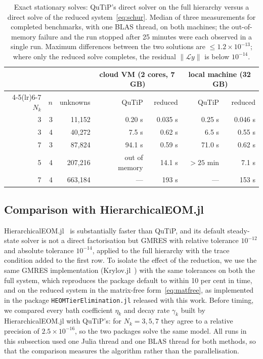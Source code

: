 \documentclass[11pt,a4paper]{article}
\newcommand{\Lc}{\mathcal{L}}
\begin{document}
\begin{table}[h]
\centering\small
\begin{tabular}{rrrrrrr}
\toprule
& & & \multicolumn{2}{c}{cloud VM (2 cores, 7\,GB)} & \multicolumn{2}{c}{local machine (32\,GB)}\\
\cmidrule(lr){4-5}\cmidrule(lr){6-7}
$N_k$ & $n$ & unknowns & QuTiP & reduced & QuTiP & reduced\\
\midrule
3 & 3 & 11{,}152 & 0.20 s & 0.035 s & 0.25 s & 0.046 s\\
3 & 4 & 40{,}272 & 7.5 s & 0.62 s & 6.5 s & 0.55 s\\
7 & 3 & 87{,}824 & 94.1 s & 0.59 s & 71.0 s & 0.62 s\\
5 & 4 & 207{,}216 & out of memory & 14.1 s & $> 25$ min & 7.1 s\\
7 & 4 & 663{,}184 & --- & 193 s & --- & 153 s\\
\bottomrule
\end{tabular}
\caption{Exact stationary solves: QuTiP's direct solver on the full hierarchy
versus a direct solve of the reduced system~\eqref{eq:schur}. Median of three measurements for completed benchmarks, with one BLAS thread, on
both machines; the out-of-memory failure and the run stopped after 25 minutes
were each observed in a single run. Maximum differences between the two
solutions are $\le 1.2\times10^{-13}$; where only the
reduced solve completes, the residual $\|\Lc y\|$ is below $10^{-14}$.}
\label{tab:qutip}
\end{table}

\subsection{Comparison with HierarchicalEOM.jl}

HierarchicalEOM.jl~\cite{Huang2023} is substantially faster than QuTiP, and its
default steady-state solver is not a direct factorisation but GMRES with
relative tolerance $10^{-12}$ and absolute tolerance $10^{-14}$, applied to the
full hierarchy with the trace condition added to the first row. To isolate the
effect of the reduction, we use the same GMRES implementation
(Krylov.jl~\cite{Krylov2023}) with the same tolerances on both the full system,
which reproduces the package default to within 10 per cent in time, and on the
reduced system in the matrix-free form~\eqref{eq:matfree}, as implemented in
the package \texttt{HEOMTierElimination.jl} released with this work. Before
timing, we compared every bath coefficient $\eta_k$ and decay rate $\gamma_k$
built by HierarchicalEOM.jl with QuTiP's: for $N_k = 3, 5, 7$ they agree to a
relative precision of $2.5\times10^{-16}$, so the two packages solve the same
model. All runs in this subsection used one Julia thread and one BLAS thread for
both methods, so that the comparison measures the algorithm rather than the
parallelisation.
\end{document}

